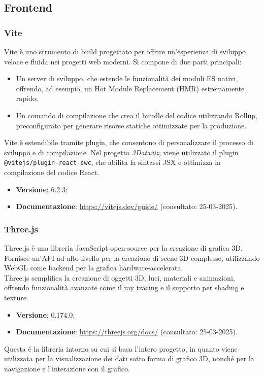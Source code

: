 \subsection{Frontend}
\subsubsection{Vite}
Vite è uno strumento di build progettato per offrire un'esperienza di sviluppo
veloce e fluida nei progetti web moderni. Si compone di due parti principali:
\begin{itemize}
    \item Un server di sviluppo, che estende le funzionalità dei moduli ES nativi,
          offrendo, ad esempio, un Hot Module Replacement (HMR) estremamente rapido;
    \item Un comando di compilazione che crea il bundle del codice utilizzando Rollup,
          preconfigurato per generare risorse statiche ottimizzate per la produzione.
\end{itemize}
Vite è estendibile tramite plugin, che consentono di personalizzare
il processo di sviluppo e di compilazione. Nel progetto \textit{3Dataviz}, viene utilizzato il
plugin \texttt{@vitejs/plugin-react-swc}, che abilita la sintassi JSX e ottimizza la compilazione del codice React.

\begin{itemize}
    \item \textbf{Versione}: 6.2.3;
    \item \textbf{Documentazione}: \url{https://vitejs.dev/guide/} (consultato:
          25-03-2025).
\end{itemize}

\subsubsection{Three.js}
Three.js è una libreria JavaScript open-source per la creazione di grafica 3D.
Fornisce un'API ad alto livello per la creazione di scene 3D complesse,
utilizzando WebGL come backend per la grafica hardware-accelerata. \\Three.js
semplifica la creazione di oggetti 3D, luci, materiali e animazioni, offrendo
funzionalità avanzate come il ray tracing e il supporto per shading e texture.
\begin{itemize}
    \item \textbf{Versione}: 0.174.0;
    \item \textbf{Documentazione}: \url{https://threejs.org/docs/} (consultato:
          25-03-2025).
\end{itemize}
Questa è la libreria intorno su cui si basa l'intero progetto, in quanto
viene utilizzata per la visualizzazione dei dati sotto forma di grafico 3D, nonché per la
navigazione e l'interazione con il grafico.

